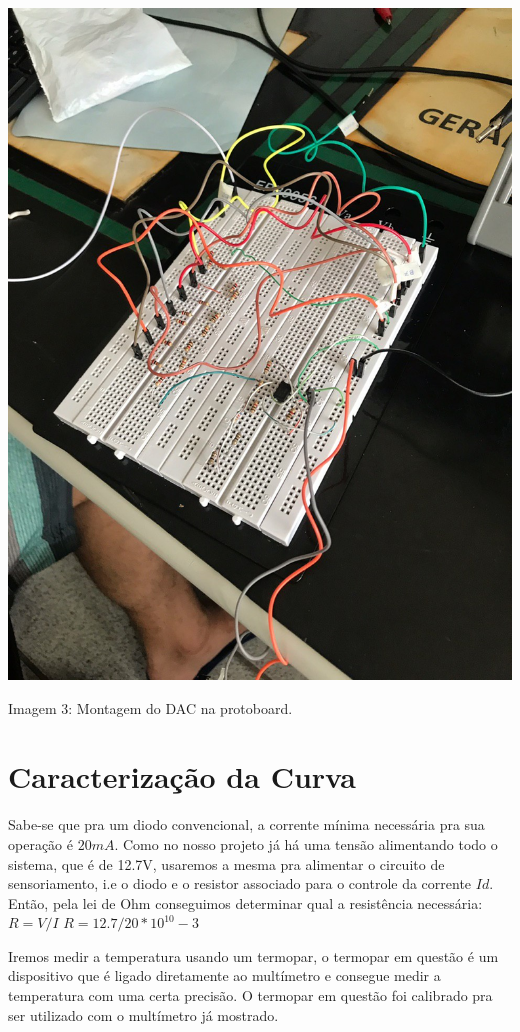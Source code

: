 \documentclass{article}
\begin{document}
\begin{center}
    \includegraphics[scale=0.2]{images/montagem_dac.jpeg}
    
    Imagem 3: Montagem do DAC na protoboard.
\end{center}

\section{Caracterização da Curva}
Sabe-se que pra um diodo convencional, a corrente mínima necessária pra sua operação é $20mA$. Como no nosso projeto já há uma tensão alimentando todo o sistema, que é de 12.7V, usaremos a mesma pra alimentar o circuito de sensoriamento, i.e o diodo e o resistor associado para o controle da corrente $Id$. Então, pela lei de Ohm conseguimos determinar qual a resistência necessária: $R=V/I$ $R=12.7/20*10^10-3$

Iremos medir a temperatura usando um termopar, o termopar em questão é um dispositivo que é ligado diretamente ao multímetro e consegue medir a temperatura com uma certa precisão. O termopar em questão foi calibrado pra ser utilizado com o multímetro já mostrado.
\end{document}
